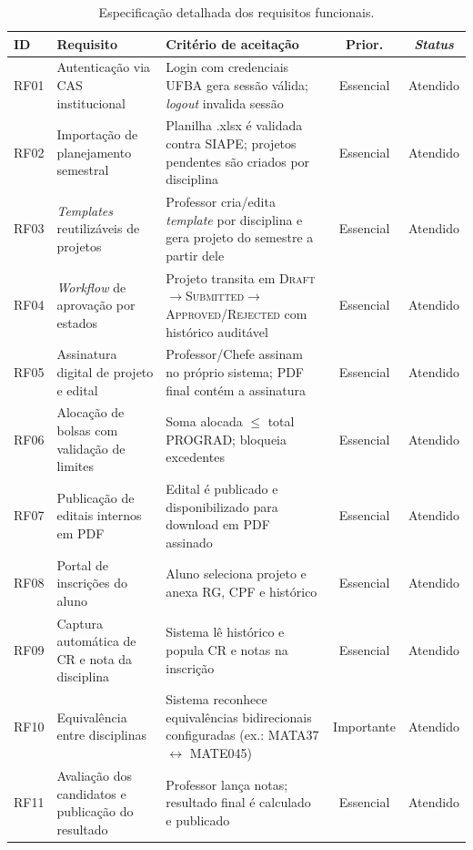 \documentclass[portuguese]{sbc2025}%
\begin{document}
\begin{table}[H]
  \centering
  \small
  \caption{Especificação detalhada dos requisitos funcionais.}
  \label{tab:rf-detalhe}
  \begin{tabular}{|l|p{5.5cm}|p{6.0cm}|c|c|}
    \hline
    \textbf{ID} & \textbf{Requisito} & \textbf{Critério de aceitação} & \textbf{Prior.} & \textbf{\textit{Status}} \\
    \hline
    RF01 & Autenticação via CAS institucional & Login com credenciais UFBA gera sessão válida; \textit{logout} invalida sessão & Essencial & Atendido \\ \hline
    RF02 & Importação de planejamento semestral & Planilha .xlsx é validada contra SIAPE; projetos pendentes são criados por disciplina & Essencial & Atendido \\ \hline
    RF03 & \textit{Templates} reutilizáveis de projetos & Professor cria/edita \textit{template} por disciplina e gera projeto do semestre a partir dele & Essencial & Atendido \\ \hline
    RF04 & \textit{Workflow} de aprovação por estados & Projeto transita em \textsc{Draft}$\to$\textsc{Submitted}$\to$\textsc{Approved/Rejected} com histórico auditável & Essencial & Atendido \\ \hline
    RF05 & Assinatura digital de projeto e edital & Professor/Chefe assinam no próprio sistema; PDF final contém a assinatura & Essencial & Atendido \\ \hline
    RF06 & Alocação de bolsas com validação de limites & Soma alocada $\leq$ total PROGRAD; bloqueia excedentes & Essencial & Atendido \\ \hline
    RF07 & Publicação de editais internos em PDF & Edital é publicado e disponibilizado para download em PDF assinado & Essencial & Atendido \\ \hline
    RF08 & Portal de inscrições do aluno & Aluno seleciona projeto e anexa RG, CPF e histórico & Essencial & Atendido \\ \hline
    RF09 & Captura automática de CR e nota da disciplina & Sistema lê histórico e popula CR e notas na inscrição & Essencial & Atendido \\ \hline
    RF10 & Equivalência entre disciplinas & Sistema reconhece equivalências bidirecionais configuradas (ex.: MATA37 $\leftrightarrow$ MATE045) & Importante & Atendido \\ \hline
    RF11 & Avaliação dos candidatos e publicação do resultado & Professor lança notas; resultado final é calculado e publicado & Essencial & Atendido \\ \hline

\end{tabular}
\end{table}
\end{document}
